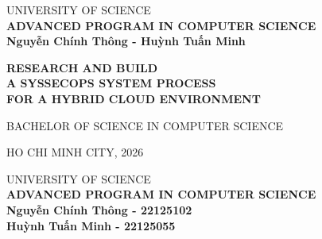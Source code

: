 \begin{titlepage}

\begin{center}
UNIVERSITY OF SCIENCE\\
\textbf{ADVANCED PROGRAM IN COMPUTER SCIENCE}\\[2cm]


{ \Large \bfseries Nguyễn Chính Thông - Huỳnh Tuấn Minh\\[2cm] } 


{ \Large \bfseries RESEARCH AND BUILD\\A SYSSECOPS SYSTEM PROCESS\\FOR A HYBRID CLOUD ENVIRONMENT \\[3cm]} 


\large BACHELOR OF SCIENCE IN COMPUTER SCIENCE\\



\vfill
HO CHI MINH CITY, 2026

\end{center}

\pagebreak



\begin{center}

UNIVERSITY OF SCIENCE\\
\textbf{ADVANCED PROGRAM IN COMPUTER SCIENCE}\\[2cm]


{\large \bfseries Nguyễn Chính Thông - 22125102\\} 
{\large \bfseries Huỳnh Tuấn Minh - 22125055\\[2cm]}


\end{center}
\end{titlepage}
